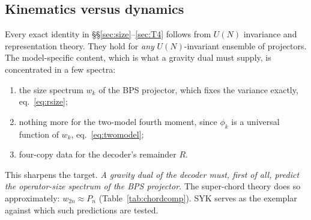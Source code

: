 \documentclass[11pt]{article}
\theoremstyle{remark}
\begin{document}
\subsection{Kinematics versus dynamics}
Every exact identity in \S\S\ref{sec:size}--\ref{sec:T4} follows from $U(N)$ invariance and representation theory. They
hold for \emph{any} $U(N)$-invariant ensemble of projectors. The model-specific content, which is what a gravity dual
must supply, is concentrated in a few spectra:
\begin{enumerate}\itemsep1pt
\item the size spectrum $w_k$ of the BPS projector, which fixes the variance exactly, eq.~\eqref{eq:rsize};
\item nothing more for the two-model fourth moment, since $\phi_k$ is a universal function of $w_k$,
  eq.~\eqref{eq:twomodel};
\item four-copy data for the decoder's remainder $R$.
\end{enumerate}
This sharpens the target. \emph{A gravity dual of the decoder must, first of all, predict the operator-size spectrum of
the BPS projector.} The super-chord theory does so approximately: $w_{2n}\approx P_n$ (Table~\ref{tab:chordcomp}). SYK
serves as the exemplar against which such predictions are tested.
\end{document}
